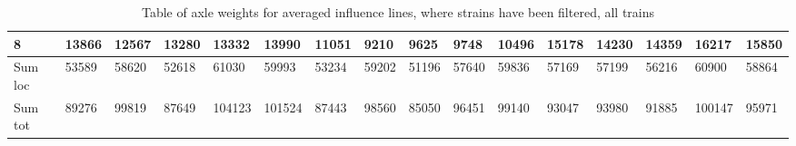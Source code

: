 \begin{table}[h]
\begin{adjustbox}{center}
\begin{tabularx}{\pagewidth}{ |X|X|X|X|X|X|X|X|X|X|X|X|X|X|X|X| }
			\hline
			8 & 13866   &    12567   &    13280   &    13332   &    13990   &    11051   &     9210   &     9625   &     9748   &    10496    &   15178    &   14230    &   14359   &    16217 &	15850 \\
			\hline
			Sum loc & 53589   &    58620   &    52618   &    61030   &    59993   &    53234   &    59202   &    51196   &    57640   &    59836    &   57169    &   57199    &   56216   &    60900 &	58864 \\
			\hline
			Sum tot & 89276   &    99819   &    87649   &   104123   &   101524   &    87443   &    98560   &    85050   &    96451   &    99140    &   93047    &   93980    &   91885   &   100147 &	95971 \\
			\hline
		\end{tabularx}
	\end{adjustbox}
	\caption{Table of axle weights for averaged influence lines, where strains have been filtered, all trains}
	\label{table:axleWeights_filteredStrains_trains_all_sensors}
\end{table}

